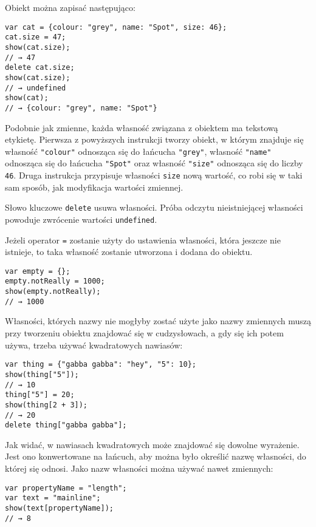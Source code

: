     
\index{\{\}}Obiekt można zapisać następująco:

    
\begin{verbatim} 
var cat = {colour: "grey", name: "Spot", size: 46};
cat.size = 47;
show(cat.size);
// → 47
delete cat.size;
show(cat.size);
// → undefined
show(cat);
// → {colour: "grey", name: "Spot"}
\end{verbatim}
    
Podobnie jak zmienne, każda własność związana z obiektem ma tekstową etykietę. Pierwsza z powyższych instrukcji tworzy obiekt, w którym znajduje się własność \texttt{"colour"} odnosząca się do łańcucha \texttt{"grey"}, własność \texttt{"name"} odnosząca się do łańcucha \texttt{"Spot"} oraz własność \texttt{"size"} odnosząca się do liczby \texttt{46}. Druga instrukcja przypisuje własności \texttt{size} nową wartość, co robi się w taki sam sposób, jak modyfikacja wartości zmiennej.

    
Słowo kluczowe \texttt{delete} usuwa własności. Próba odczytu nieistniejącej własności powoduje zwrócenie wartości \texttt{undefined}.

    
Jeżeli operator \texttt{=}\index{=} zostanie użyty do ustawienia własności, która jeszcze nie istnieje, to taka własność zostanie utworzona i dodana do obiektu.

    
\begin{verbatim} 
var empty = {};
empty.notReally = 1000;
show(empty.notReally);
// → 1000
\end{verbatim}
    
Własności, których nazwy nie mogłyby zostać użyte jako nazwy zmiennych muszą przy tworzeniu obiektu znajdować się w cudzysłowach, a gdy się ich potem używa, trzeba używać kwadratowych nawiasów:

    
\begin{verbatim} 
var thing = {"gabba gabba": "hey", "5": 10};
show(thing["5"]);
// → 10
thing["5"] = 20;
show(thing[2 + 3]);
// → 20
delete thing["gabba gabba"];
\end{verbatim}
    
Jak widać, w nawiasach kwadratowych może znajdować się dowolne wyrażenie. Jest ono konwertowane na łańcuch, aby można było określić nazwę własności, do której się odnosi. Jako nazw własności można używać nawet zmiennych:

    
\begin{verbatim} 
var propertyName = "length";
var text = "mainline";
show(text[propertyName]);
// → 8
\end{verbatim}
    
